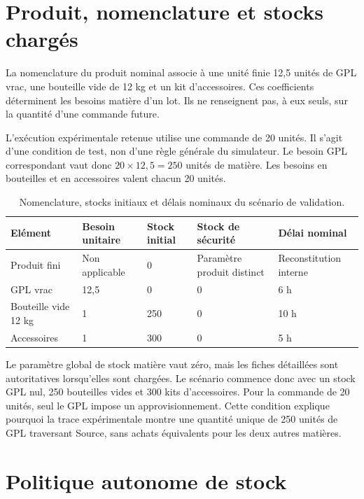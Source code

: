 \section{Produit, nomenclature et stocks chargés}

La nomenclature du produit nominal associe à une unité finie 12,5 unités de GPL vrac, une bouteille vide de 12 kg et un kit d'accessoires. Ces coefficients déterminent les besoins matière d'un lot. Ils ne renseignent pas, à eux seuls, sur la quantité d'une commande future.

L'exécution expérimentale retenue utilise une commande de 20 unités. Il s'agit d'une condition de test, non d'une règle générale du simulateur. Le besoin GPL correspondant vaut donc \(20 \times 12{,}5 = 250\) unités de matière. Les besoins en bouteilles et en accessoires valent chacun 20 unités.

\begin{table}[H]
  \centering
  \caption{Nomenclature, stocks initiaux et délais nominaux du scénario de validation.}
  \label{tab:conditions-initiales}
  \begin{tabularx}{\textwidth}{@{}L{0.26\textwidth}L{0.15\textwidth}L{0.15\textwidth}L{0.15\textwidth}Y@{}}
    \toprule
    Elément & Besoin unitaire & Stock initial & Stock de sécurité & Délai nominal \\
    \midrule
    Produit fini & Non applicable & 0 & Paramètre produit distinct & Reconstitution interne \\
    GPL vrac & 12,5 & 0 & 0 & 6 h \\
    Bouteille vide 12 kg & 1 & 250 & 0 & 10 h \\
    Accessoires & 1 & 300 & 0 & 5 h \\
    \bottomrule
  \end{tabularx}
\end{table}

Le paramètre global de stock matière vaut zéro, mais les fiches détaillées sont autoritatives lorsqu'elles sont chargées. Le scénario commence donc avec un stock GPL nul, 250 bouteilles vides et 300 kits d'accessoires. Pour la commande de 20 unités, seul le GPL impose un approvisionnement. Cette condition explique pourquoi la trace expérimentale montre une quantité unique de 250 unités de GPL traversant Source, sans achats équivalents pour les deux autres matières.

\section{Politique autonome de stock}


